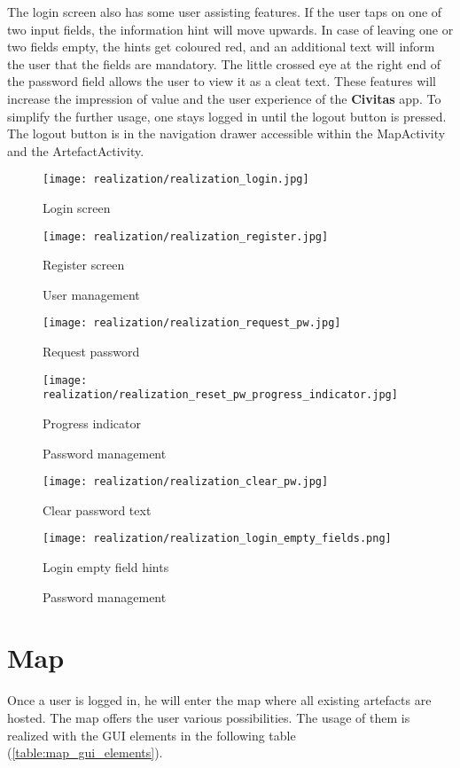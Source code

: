 The login screen also has some user assisting features. If the user taps on one of two input fields, the information hint will move upwards. In case of leaving one or two fields empty, the hints get coloured red, and an additional text will inform the user that the fields are mandatory. The little crossed eye at the right end of the password field allows the user to view it as a cleat text. These features will increase the impression of value and the user experience of the \textbf{Civitas} app. 
To simplify the further usage, one stays logged in until the logout button is pressed. The logout button is in the navigation drawer accessible within the MapActivity and the ArtefactActivity.

\begin{figure}[!htb]
  \texttt{[image: realization/realization\_login.jpg]}
  \caption{Login screen}
  \label{fig:login_screen}
\endminipage\hfill
{}
  \texttt{[image: realization/realization\_register.jpg]}
  \caption{Register screen}
  \label{fig:register_screen}
\endminipage\hfill
\caption{User management}
\label{fig:user_management}
\end{figure}

\begin{figure}[!htb]
  \texttt{[image: realization/realization\_request\_pw.jpg]}
  \caption{Request password}
  \label{fig:pw_request}
\endminipage\hfill
{}
  \texttt{[image: realization/realization\_reset\_pw\_progress\_indicator.jpg]}
  \caption{Progress indicator}
  \label{fig:pw_request_progress}
\endminipage\hfill
\caption{Password management}
\label{fig:pw_management}
\end{figure}

\begin{figure}[!htb]
  \texttt{[image: realization/realization\_clear\_pw.jpg]}
  \caption{Clear password text}
  \label{fig:clear_pw}
\endminipage\hfill
{}
  \texttt{[image: realization/realization\_login\_empty\_fields.png]}
  \caption{Login empty field hints}
  \label{fig:login_empty_fields}
\endminipage\hfill
\caption{Password management}
\label{fig:hint_management}
\end{figure}


\section{Map}
Once a user is logged in, he will enter the map where all existing artefacts are hosted. The map offers the user various possibilities. The usage of them is realized with the GUI elements in the following table (\ref{table:map_gui_elements}).  

